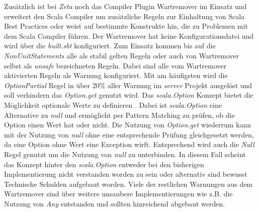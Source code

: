 Zusätzlich ist bei \textit{Zeta} noch das Compiler Plugin Wartremover im Einsatz und erweitert den Scala Compiler um zusätzliche Regeln zur Einhaltung von Scala Best Practices oder weist auf bestimmte Konstrukte hin, die zu Problemen mit dem Scala Compiler führen. Der Wartremover hat keine Konfigurationsdatei und wird über die \textit{built.sbt} konfiguriert. Zum Einsatz kommen bis auf die \textit{NonUnitStatements} alle als stabil gelten Regeln oder auch von Wartremover selbst als \textit{unsafe} bezeichneten Regeln. Dabei sind alle vom Wartremover aktivierten Regeln als Warnung konfiguriert. Mit am häufigsten wird die \textit{OptionPartial} Regel in über 20\% aller Warnung im \textit{server} Projekt ausgelöst und soll verhindern das \textit{Option.get} genutzt wird. Das \textit{scala.Option} Konzept bietet die Möglichkeit optionale Werte zu definieren \cite{scala.option}. Dabei ist \textit{scala.Option} eine Alternative zu \textit{null} und ermöglicht per Pattern Matching zu prüfen, ob die Option einen Wert hat oder nicht. Die Nutzung von \textit{Option.get} wiederrum kann mit der Nutzung von \textit{null} ohne eine entsprechende Prüfung gleichgesetzt werden, da eine  Option ohne Wert eine Exception wirft. Entsprechend wird auch die \textit{Null} Regel genutzt um die Nutzung von \textit{null} zu unterbinden. In diesem Fall scheint das Konzept hinter den \textit{scala.Option} entweder bei den bisherigen Implementierung nicht verstanden worden zu sein oder alternativ sind bewusst Technische Schulden aufgebaut worden. Viele der restlichen Warnungen aus dem Wartremover sind über weitere unsaubere Implementierungen wie z.B. die Nutzung von \textit{Any} entstanden und sollten hinreichend abgebaut werden.

